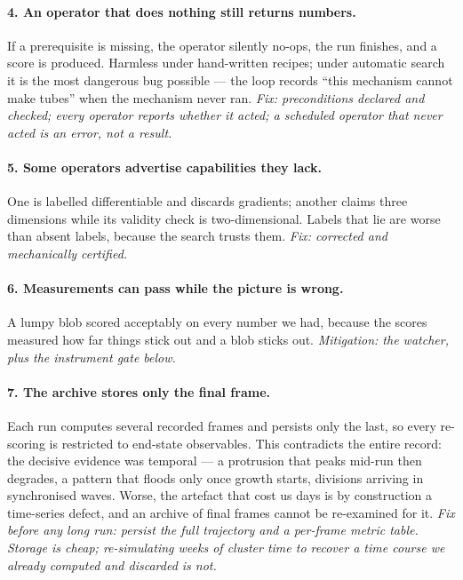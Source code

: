 \documentclass[11pt]{article}
\begin{document}
\paragraph{4. An operator that does nothing still returns numbers.} If a prerequisite is missing,
the operator silently no-ops, the run finishes, and a score is produced. Harmless under
hand-written recipes; under automatic search it is the most dangerous bug possible --- the loop
records ``this mechanism cannot make tubes'' when the mechanism never ran. \emph{Fix:
preconditions declared and checked; every operator reports whether it acted; a scheduled operator
that never acted is an error, not a result.}

\paragraph{5. Some operators advertise capabilities they lack.} One is labelled differentiable and
discards gradients; another claims three dimensions while its validity check is two-dimensional.
Labels that lie are worse than absent labels, because the search trusts them. \emph{Fix:
corrected and mechanically certified.}

\paragraph{6. Measurements can pass while the picture is wrong.} A lumpy blob scored acceptably on
every number we had, because the scores measured how far things stick out and a blob sticks out.
\emph{Mitigation: the watcher, plus the instrument gate below.}

\paragraph{7. \textcolor{cop}{The archive stores only the final frame.}} Each run computes several
recorded frames and persists only the last, so every re-scoring is restricted to end-state
observables. This contradicts the entire record: the decisive evidence was temporal --- a
protrusion that peaks mid-run then degrades, a pattern that floods only once growth starts,
divisions arriving in synchronised waves. Worse, the artefact that cost us days is by construction
a time-series defect, and an archive of final frames cannot be re-examined for it. \emph{Fix
before any long run: persist the full trajectory and a per-frame metric table. Storage is cheap;
re-simulating weeks of cluster time to recover a time course we already computed and discarded is
not.}
\end{document}
